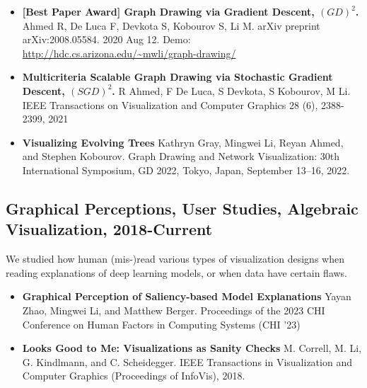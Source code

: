 \documentclass[letterpaper,11pt,oneside]{article}
\begin{document}
\begin{itemize}
    \item \textbf{[Best Paper Award] Graph Drawing via Gradient Descent, $(GD)^2$. }
        Ahmed R, De Luca F, Devkota S, Kobourov S, Li M. 
        arXiv preprint arXiv:2008.05584. 2020 Aug 12. Demo: \url{http://hdc.cs.arizona.edu/~mwli/graph-drawing/}
    \item \textbf{Multicriteria Scalable Graph Drawing via Stochastic Gradient Descent, $(SGD)^2$.}
        R Ahmed, F De Luca, S Devkota, S Kobourov, M Li. 
        IEEE Transactions on Visualization and Computer Graphics 28 (6), 2388-2399, 2021
    \item \textbf{Visualizing Evolving Trees}
        Kathryn Gray, Mingwei Li, Reyan Ahmed, and Stephen Kobourov. 
        Graph Drawing and Network Visualization: 30th International Symposium, GD 2022, Tokyo, Japan, September 13–16, 2022.
\end{itemize}


\subsection*{Graphical Perceptions, User Studies, Algebraic Visualization, 2018-Current}
We studied how human (mis-)read various types of visualization designs when reading explanations of deep learning models, or when data have certain flaws.
    \begin{itemize}
        \item \textbf{Graphical Perception of Saliency-based Model Explanations}
            Yayan Zhao, Mingwei Li, and Matthew Berger.
            Proceedings of the 2023 CHI Conference on Human Factors in Computing Systems (CHI '23)
        \item \textbf{Looks Good to Me: Visualizations as Sanity Checks}
            M. Correll, M. Li, G. Kindlmann, and C. Scheidegger. 
            IEEE Transactions in Visualization and Computer Graphics (Proceedings of InfoVis), 2018.
    \end{itemize}
\end{document}
